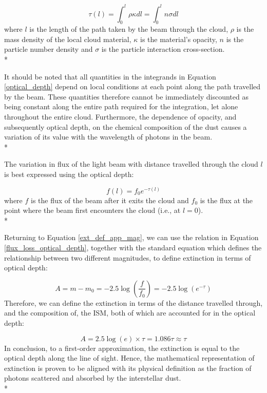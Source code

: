 \documentclass[12pt, a4paper]{report}
\begin{document}
\begin{equation}
\tau(l) = \int_{0}^{l} \rho \kappa dl = \int_{0}^{l} n \sigma dl
\label{optical_depth}
\end{equation}
where $l$ is the length of the path taken by the beam through the cloud, $\rho$ is the mass density of the local cloud material, $\kappa$ is the material's opacity, $n$ is the particle number density and $\sigma$ is the particle interaction cross-section.\\*

It should be noted that all quantities in the integrands in Equation \ref{optical_depth} depend on local conditions at each point along the path travelled by the beam. These quantities therefore cannot be immediately discounted as being constant along the entire path required for the integration, let alone throughout the entire cloud. Furthermore, the dependence of opacity, and subsequently optical depth, on the chemical composition of the dust causes a variation of its value with the wavelength of photons in the beam.\\*

The variation in flux of the light beam with distance travelled through the cloud $l$ is best expressed using the optical depth:

\begin{equation}
f(l) = f_{0} e^{-\tau(l)}
\label{flux_loss_optical_depth}
\end{equation}
where $f$ is the flux of the beam after it exits the cloud and $f_{0}$ is the flux at the point where the beam first encounters the cloud (i.e., at $l = 0$). \\*

Returning to Equation \ref{ext_def_app_mag}, we can use the relation in Equation \ref{flux_loss_optical_depth}, together with the standard equation which defines the relationship between two different magnitudes, to define extinction in terms of optical depth:

\begin{equation}
A = m - m_{0} = -2.5\log\left(\frac{f}{f_{0}}\right) = -2.5\log(e^{-\tau})
\label{ext_optical_depth_mags}
\end{equation}
Therefore, we can define the extinction in terms of the distance travelled through, and the composition of, the ISM, both of which are accounted for in the optical depth:

\begin{equation}
A = 2.5\log(e) \times \tau = 1.086\tau \approx \tau
\label{ext_optical_depth}
\end{equation}
In conclusion, to a first-order approximation, the extinction is equal to the optical depth along the line of sight. Hence, the mathematical representation of extinction is proven to be aligned with its physical definition as the fraction of photons scattered and absorbed by the interstellar dust. \\*
\end{document}
